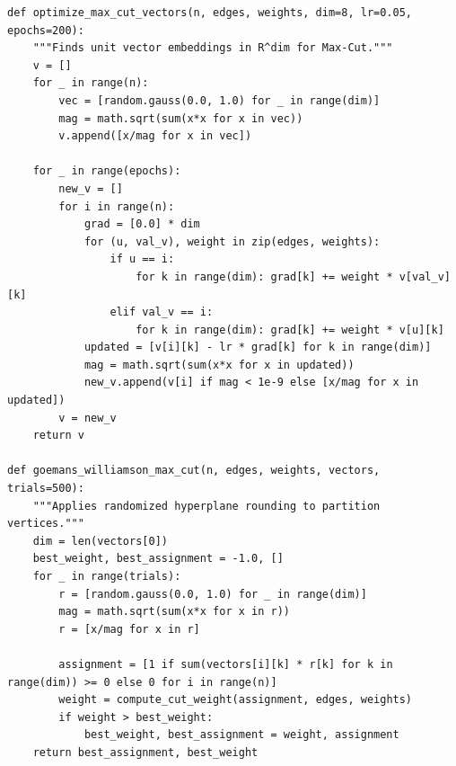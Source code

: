 \documentclass[11pt,oneside]{book}
\begin{document}
\begin{lstlisting}[style=python, caption=Goemans-Williamson Max-Cut Algorithm]
def optimize_max_cut_vectors(n, edges, weights, dim=8, lr=0.05, epochs=200):
    """Finds unit vector embeddings in R^dim for Max-Cut."""
    v = []
    for _ in range(n):
        vec = [random.gauss(0.0, 1.0) for _ in range(dim)]
        mag = math.sqrt(sum(x*x for x in vec))
        v.append([x/mag for x in vec])
        
    for _ in range(epochs):
        new_v = []
        for i in range(n):
            grad = [0.0] * dim
            for (u, val_v), weight in zip(edges, weights):
                if u == i:
                    for k in range(dim): grad[k] += weight * v[val_v][k]
                elif val_v == i:
                    for k in range(dim): grad[k] += weight * v[u][k]
            updated = [v[i][k] - lr * grad[k] for k in range(dim)]
            mag = math.sqrt(sum(x*x for x in updated))
            new_v.append(v[i] if mag < 1e-9 else [x/mag for x in updated])
        v = new_v
    return v

def goemans_williamson_max_cut(n, edges, weights, vectors, trials=500):
    """Applies randomized hyperplane rounding to partition vertices."""
    dim = len(vectors[0])
    best_weight, best_assignment = -1.0, []
    for _ in range(trials):
        r = [random.gauss(0.0, 1.0) for _ in range(dim)]
        mag = math.sqrt(sum(x*x for x in r))
        r = [x/mag for x in r]
        
        assignment = [1 if sum(vectors[i][k] * r[k] for k in range(dim)) >= 0 else 0 for i in range(n)]
        weight = compute_cut_weight(assignment, edges, weights)
        if weight > best_weight:
            best_weight, best_assignment = weight, assignment
    return best_assignment, best_weight
\end{lstlisting}
\end{document}
